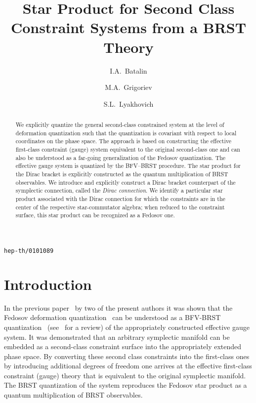 \documentclass[a4paper,11pt]{amsart}
\numberwithin{thm}{section} %
\numberwithin{equation}{section} %
\numberwithin{figure}{section} %
\renewcommand{\:}{{\rm\, :\,}}
\begin{document}
\thispagestyle{empty}
\addtolength{\baselineskip}{4pt}
\addtolength{\parskip}{2pt}
\raggedbottom

{\hfill{\lowercase{\tt hep-th/0101089}}\\[12pt]}
\title{Star Product for Second Class
Constraint Systems from a BRST Theory}
\author{I.A.~Batalin}
\address{I.~A.~B. \quad Lebedev Physics Institute, Russian Academy of Sciences}
\author{M.A.~Grigoriev}
\address{M.~A.~G. \quad Lebedev Physics Institute, Russian Academy of Sciences}
\author{S.L.~Lyakhovich}
\address{S.~L.~L.  \quad Department of Physics, Tomsk State University}


\begin{abstract}
  We explicitly quantize the general second-class constrained system
  at the level of deformation quantization such that the quantization
  is covariant with respect to local coordinates on the phase space.
  The approach is based on constructing the effective first-class
  constraint (gauge) system equivalent to the original second-class
  one and can also be understood as a far-going generalization of the
  Fedosov quantization.  The effective gauge system is quantized by
  the BFV--BRST procedure.  The star product for the Dirac bracket is
  explicitly constructed as the quantum multiplication of BRST
  observables.  We introduce and explicitly construct a Dirac bracket
  counterpart of the symplectic connection, called the \textit{Dirac
    connection}.  We identify a particular star product associated
  with the Dirac connection for which the constraints are in the
  center of the respective star-commutator algebra; when reduced to
  the constraint surface, this star product can be recognized as a
  Fedosov one.
\end{abstract}

\maketitle
\thispagestyle{empty}


\section{Introduction}
In the previous paper~\cite{[GL]} by two of the present authors it was
shown that the Fedosov deformation quantization~\cite{[Fedosov-JDG]}
can be understood as a BFV-BRST quantization~\cite{[BFV]}
(see~\cite{[HT]} for a review) of the appropriately constructed
effective gauge system.  It was demonstrated that an arbitrary
symplectic manifold can be embedded as a second-class constraint
surface into the appropriately extended phase space.  By converting
these second class constraints into the first-class ones by
introducing additional degrees of freedom one arrives at the effective
first-class constraint (gauge) theory that is equivalent to the
original symplectic manifold.  The BRST quantization of the system
reproduces the Fedosov star product as a quantum multiplication of
BRST observables.
\end{document}
